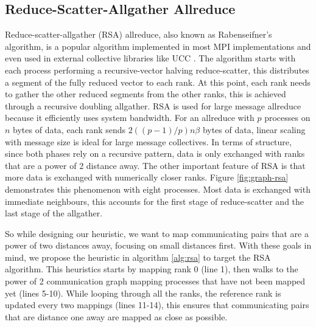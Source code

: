 \subsection{Reduce-Scatter-Allgather Allreduce}
Reduce-scatter-allgather (RSA) allreduce, also known as Rabenseifner's algorithm, is a popular algorithm implemented in most MPI implementations and even used in external collective libraries like UCC \cite{UCC}.
The algorithm starts with each process performing a recursive-vector halving reduce-scatter, this distributes a segment of the fully reduced vector to each rank.
At this point, each rank needs to gather the other reduced segments from the other ranks, this is achieved through a recursive doubling allgather.
RSA is used for large message allreduce because it efficiently uses system bandwidth.
For an allreduce with $p$ processes on $n$ bytes of data, each rank sends $2((p-1)/p)n\beta$ bytes of data, linear scaling with message size is ideal for large message collectives.
In terms of structure, since both phases rely on a recursive pattern, data is only exchanged with ranks that are a power of 2 distance away.
The other important feature of RSA is that more data is exchanged with numerically closer ranks.
Figure \ref{fig:graph-rsa} demonstrates this phenomenon with eight processes.
Most data is exchanged with immediate neighbours, this accounts for the first stage of reduce-scatter and the last stage of the allgather.

So while designing our heuristic, we want to map communicating pairs that are a power of two distances away, focusing on small distances first.
With these goals in mind, we propose the heuristic in algorithm \ref{alg:rsa} to target the RSA algorithm.
This heuristics starts by mapping rank 0 (line 1), then walks to the power of 2 communication graph mapping processes that have not been mapped yet (lines 5-10). 
While looping through all the ranks, the reference rank is updated every two mappings (lines 11-14), this ensures that communicating pairs that are distance one away are mapped as close as possible. 


% 


